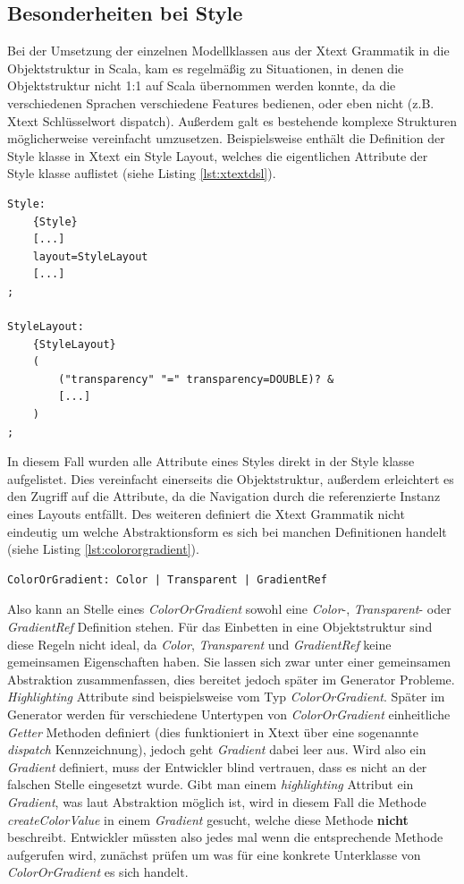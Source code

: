 \subsection{Besonderheiten bei Style}\label{specialstyle}
Bei der Umsetzung der einzelnen Modellklassen aus der Xtext Grammatik in die Objektstruktur in Scala, kam es regelmäßig zu Situationen, in denen die Objektstruktur nicht 1:1 auf Scala übernommen werden konnte, da die verschiedenen Sprachen verschiedene Features bedienen, oder eben nicht (z.B. Xtext Schlüsselwort dispatch). Außerdem galt es bestehende komplexe Strukturen möglicherweise vereinfacht umzusetzen. Beispielsweise enthält die Definition der Style klasse in Xtext ein Style Layout, welches die eigentlichen Attribute der Style klasse auflistet (siehe Listing \ref{lst:xtextdsl}).
\begin{lstlisting}[style=spray, caption={stark vereinfachter Auszug aus der Xtext Grammatik, die Styles beschreibt}, label = {lst:xtextdsl}]
Style:
    {Style}
    [...]
    layout=StyleLayout
    [...]
;
	
StyleLayout: 
    {StyleLayout}
    (
        ("transparency" "=" transparency=DOUBLE)? &
        [...]
    )
;
\end{lstlisting}
In diesem Fall wurden alle Attribute eines Styles direkt in der Style klasse aufgelistet. Dies vereinfacht einerseits die Objektstruktur, außerdem erleichtert es den Zugriff auf die Attribute, da die Navigation durch die referenzierte Instanz eines Layouts entfällt. Des weiteren definiert die Xtext Grammatik nicht eindeutig um welche Abstraktionsform es sich bei manchen Definitionen handelt (siehe Listing \ref{lst:colororgradient}).
\begin{lstlisting}[style=spray, caption = {Auszug aus der Style.xtext Grammatik, Definition der ColorOrGradient}, label = {lst:colororgradient}]
ColorOrGradient: Color | Transparent | GradientRef
\end{lstlisting}
Also kann an Stelle eines \textit{ColorOrGradient} sowohl eine \textit{Color}-, \textit{Transparent}- oder \textit{GradientRef} Definition stehen. Für das Einbetten in eine Objektstruktur sind diese Regeln nicht ideal, da \textit{Color}, \textit{Transparent} und \textit{GradientRef} keine gemeinsamen Eigenschaften haben. Sie lassen sich zwar unter einer gemeinsamen Abstraktion zusammenfassen, dies bereitet jedoch später im Generator Probleme. \textit{Highlighting} Attribute sind beispielsweise vom Typ \textit{ColorOrGradient}. Später im Generator werden für verschiedene Untertypen von \textit{ColorOrGradient} einheitliche \textit{Getter} Methoden definiert (dies funktioniert in Xtext über eine sogenannte \textit{dispatch} Kennzeichnung), jedoch geht \textit{Gradient} dabei leer aus. Wird also ein \textit{Gradient} definiert, muss der Entwickler blind vertrauen, dass es nicht an der falschen Stelle eingesetzt wurde. Gibt man einem \textit{highlighting} Attribut ein \textit{Gradient}, was laut Abstraktion möglich ist, wird in diesem Fall die Methode \textit{createColorValue} in einem \textit{Gradient} gesucht, welche diese Methode \textbf{nicht} beschreibt. Entwickler müssten also jedes mal wenn die entsprechende Methode aufgerufen wird, zunächst prüfen um was für eine konkrete Unterklasse von \textit{ColorOrGradient} es sich handelt.
